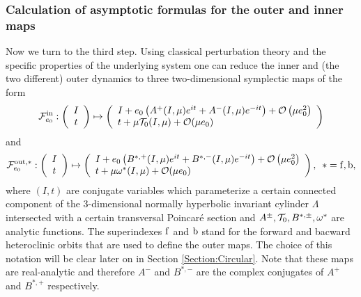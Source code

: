 \subsubsection{Calculation of asymptotic formulas for the outer and
inner maps}
Now we turn to the third step. Using classical perturbation theory 
and the specific properties of the underlying system one can reduce 
the inner and (the two different) outer dynamics to three two-dimensional
symplectic maps of the form
\begin{equation}\label{def:InnerMap:ell:intro}
  \mathcal{F}_{e_0}^{\mathrm{in}}:\left(\begin{array}{c} I\\
      t
    \end{array}\right)\mapsto \left(\begin{array}{l} I+ e_0 \left(A^+(I,\mu)e^{it}+
        A^-(I,\mu)e^{-it}\right)+\mathcal{O}\left(\mu e_0^2\right)\\
      t+\mu\mathcal{T}_0(I,\mu)+\mathcal{O}(\mu e_0)
    \end{array}\right)
\end{equation}
and
\begin{equation}\label{def:OuterMap:Elliptic:Intro}
  \mathcal{F}_{e_0}^{\mathrm{out},\ast}:\left(\begin{array}{c} I\\
      t
    \end{array}\right)\mapsto \left(\begin{array}{l} I+ e_0\left(B^{\ast,+}
        (I,\mu)e^{it}+B^{\ast,-} (I,\mu)e^{-it}\right) +\mathcal{O}\left(\mu e_0^2\right)\\
      t+\mu\omega^\ast(I,\mu)+\mathcal{O}(\mu e_0)
    \end{array}\right),\,\,\,\ast=\mathrm{f},\mathrm{b},
\end{equation}
where $(I,t)$ are conjugate variables which parameterize a certain connected
component of the 3-dimensional normally
hyperbolic invariant cylinder $\Lambda$ intersected with a certain transversal
Poincar{\'e} section and $A^\pm, \mathcal{T}_0,B^{\ast,\pm}, \omega^\ast$ are analytic
functions. The superindexes $\mathrm{f}$ and $\mathrm{b}$ stand for the forward and bacward
heteroclinic orbits that are used to define the outer maps. The choice of
this notation will be clear later on in Section \ref{Section:Circular}. Note
that these maps are real-analytic and therefore $A^-$ and $B^{\ast,-}$ are
the complex conjugates of $A^+$ and $B^{\ast,+}$ respectively.


